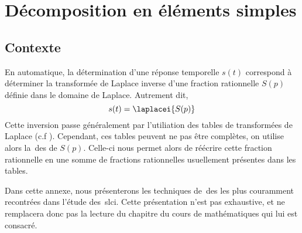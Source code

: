 \chapter{Décomposition en éléments simples\label{annexe-DES}}

\section{Contexte}
En automatique, la détermination d'une réponse temporelle $s(t)$
correspond à déterminer la transformée 
de Laplace inverse d'une fraction rationnelle $S(p)$ 
définie dans le domaine de Laplace. Autrement dit, 
\[
s(t)=\laplacei{S(p)}
\]
Cette inversion passe généralement par l'utiliation des tables de 
transformées de Laplace (c.f ).
Cependant, ces tables peuvent ne pas être complètes, on utilise alors 
la~\gls{des} de $S(p)$. Celle-ci nous permet alors de réécrire cette fraction 
rationnelle en une somme de fractions rationnelles 
usuellement présentes dans les tables.

Dans cette annexe, nous présenterons les techniques de~\gls{des} les plus 
couramment recontrées dans l'étude des~\gls{slci}. 
Cette présentation n'est pas exhaustive, et ne remplacera donc 
pas la lecture du chapitre du cours de mathématiques qui lui est consacré.

